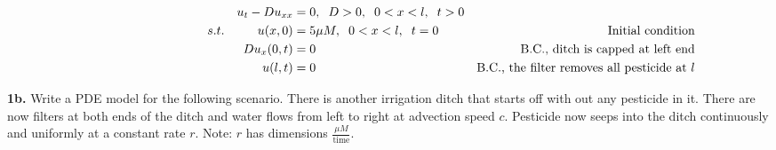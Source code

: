 \documentclass{article}
\begin{document}
\begin{align*}
&& u_t - Du_{xx} &= 0 ,\hspace{2mm} D>0,  \hspace{2mm}0<x<l,\hspace{2mm}  t>0 	 	&     &     \\
s.t. & &         u(x,0) &=   5 \mu M,      \hspace{2mm}0<x<l,\hspace{2mm}  t=0          &      \text{Initial condition}    &         \\
\hspace{40mm}  & &      Du_{x}(0,t)  &= 0               &      \text{B.C., ditch is capped at left end}     & \\
 & &  u(l,t) &= 0  & \text{B.C., the filter removes all pesticide at }l
 \end{align*}


\vspace{3mm}
\textbf{1b.} Write a PDE model for the following scenario. There is another irrigation ditch that starts off with out any pesticide in it. There are now filters at both ends of the ditch and water flows from left to right at advection speed \(c\). Pesticide now seeps into the ditch continuously and uniformly at a constant rate \(r\). Note: \(r\) has dimensions \(\frac{\mu M}{\text{time}}\). 
\end{document}
